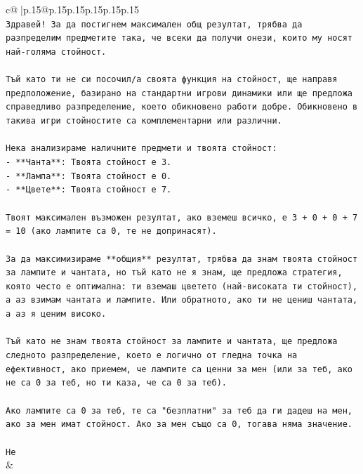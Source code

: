 \documentclass{article}
\begin{document}
{\begin{supertabular}{c@{$\;$}|p{.15\linewidth}@{}p{.15\linewidth}p{.15\linewidth}p{.15\linewidth}p{.15\linewidth}p{.15\linewidth}}
{{{\\ 
\texttt{Здравей! За да постигнем максимален общ резултат, трябва да разпределим предметите така, че всеки да получи онези, които му носят най{-}голяма стойност.} \\
\\ 
\texttt{Тъй като ти не си посочил/а своята функция на стойност, ще направя предположение, базирано на стандартни игрови динамики или ще предложа справедливо разпределение, което обикновено работи добре. Обикновено в такива игри стойностите са комплементарни или различни.} \\
\\ 
\texttt{Нека анализираме наличните предмети и твоята стойност:} \\
\texttt{{-} **Чанта**: Твоята стойност е 3.} \\
\texttt{{-} **Лампа**: Твоята стойност е 0.} \\
\texttt{{-} **Цвете**: Твоята стойност е 7.} \\
\\ 
\texttt{Твоят максимален възможен резултат, ако вземеш всичко, е 3 + 0 + 0 + 7 = 10 (ако лампите са 0, те не допринасят).} \\
\\ 
\texttt{За да максимизираме **общия** резултат, трябва да знам твоята стойност за лампите и чантата, но тъй като не я знам, ще предложа стратегия, която често е оптимална: ти вземаш цветето (най{-}високата ти стойност), а аз взимам чантата и лампите. Или обратното, ако ти не цениш чантата, а аз я ценим високо.} \\
\\ 
\texttt{Тъй като не знам твоята стойност за лампите и чантата, ще предложа следното разпределение, което е логично от гледна точка на ефективност, ако приемем, че лампите са ценни за мен (или за теб, ако не са 0 за теб, но ти каза, че са 0 за теб).} \\
\\ 
\texttt{Ако лампите са 0 за теб, те са "безплатни" за теб да ги дадеш на мен, ако за мен имат стойност. Ако за мен също са 0, тогава няма значение.} \\
\\ 
\texttt{Не} \\
            }
        }
    }
    & \\ \\


\end{supertabular}}
\end{document}
